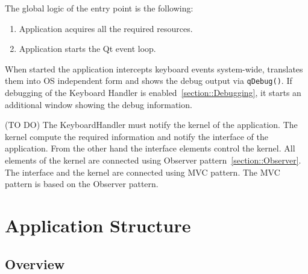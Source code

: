 \documentclass{article}
\begin{document}
The global logic of the entry point is the following:
\begin{enumerate}
\item Application acquires all the required resources.
\item Application starts the Qt event loop.
\end{enumerate}

When started the application intercepts keyboard events system-wide, translates them into OS independent form and shows the debug output via \verb"qDebug()". If debugging of the Keyboard Handler is enabled~\ref{section::Debugging}, it starts an additional window showing the debug information.

(TO DO) The KeyboardHandler must notify the kernel of the application. The kernel compute the required information and notify the interface of the application. From the other hand the interface elements control the kernel. All elements of the kernel are connected using Observer pattern~\ref{section::Observer}. The interface and the kernel are connected using MVC pattern. The MVC pattern is based on the Observer pattern.

\section{Application Structure}

\subsection{Overview}
\end{document}
